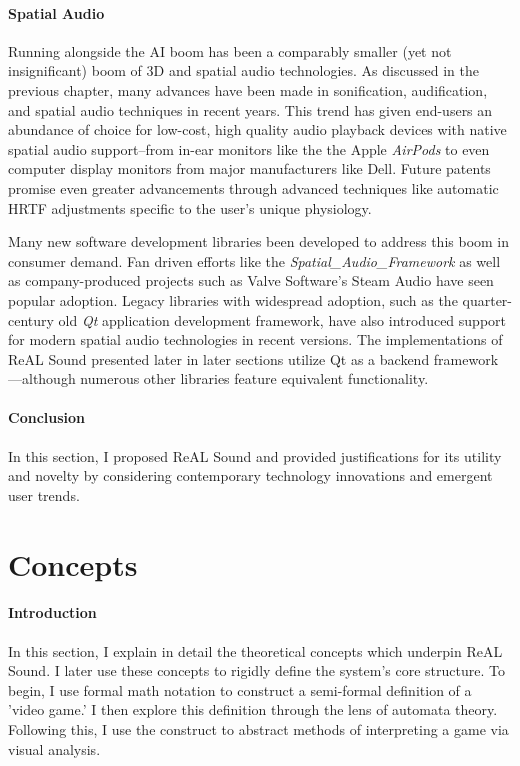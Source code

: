 \documentclass{report}
\newcommand{\rs}{ReAL Sound\xspace}
\begin{document}
\paragraph{Spatial Audio}
Running alongside the AI boom has been a comparably smaller (yet not insignificant) boom of 3D and spatial audio technologies. As discussed in the previous chapter, many advances have been made in sonification, audification, and spatial audio techniques in recent years. This trend has given end-users an abundance of choice for low-cost, high quality audio playback devices with native spatial audio support--from in-ear monitors like the the Apple \emph{AirPods}\cite{ApplePods} to even computer display monitors from major manufacturers like Dell\cite{Campbell_2025}. Future patents promise even greater advancements through advanced techniques like automatic HRTF adjustments specific to the user's unique physiology\cite{Antti2024}.


Many new software development libraries been developed to address this boom in consumer demand. Fan driven efforts like the \emph{Spatial\_Audio\_Framework}\cite{McCormack2024} as well as company-produced projects such as Valve Software's Steam Audio\cite{Valve} have seen popular adoption. Legacy libraries with widespread adoption, such as the quarter-century old \emph{Qt} application development framework\cite{QTProgramming}, have also introduced support for modern spatial audio technologies in recent versions\cite{QTSpatial}. The implementations of \rs presented later in later sections utilize Qt as a backend framework---although numerous other libraries feature equivalent functionality. 

\paragraph{Conclusion}
In this section, I proposed \rs and provided justifications for its utility and novelty by considering contemporary technology innovations and emergent user trends. 





\section{Concepts}
\paragraph{Introduction} 
In this section, I explain in detail the theoretical concepts which underpin \rs. I later use these concepts to rigidly define the system's core structure. To begin, I use formal math notation to construct a semi-formal definition of a 'video game.' I then explore this definition through the lens of automata theory. Following this, I use the construct to abstract methods of interpreting a game via visual analysis. 
\end{document}
